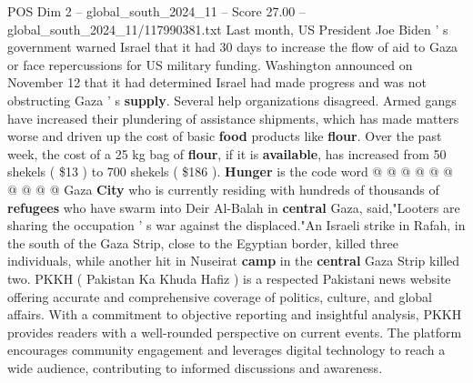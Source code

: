 \begin{textsample}{POS Dim 2 – global\_south\_2024\_11 – Score 27.00 – global\_south\_2024\_11/117990381.txt}
Last month, US President Joe Biden ' s government warned Israel that it had 30 days to increase the flow of aid to Gaza or face repercussions for US military funding.
Washington announced on November 12 that it had determined Israel had made progress and was not obstructing Gaza ' s \textbf{supply}.
Several help organizations disagreed.
Armed gangs have increased their plundering of assistance shipments, which has made matters worse and driven up the cost of basic \textbf{food} products like \textbf{flour}.
Over the past week, the cost of a 25 kg bag of \textbf{flour}, if it is \textbf{available}, has increased from 50 shekels ( \$13 ) to 700 shekels ( \$186 ). \textbf{Hunger} is the code word @ @ @ @ @ @ @ @ @ @ Gaza \textbf{City} who is currently residing with hundreds of thousands of \textbf{refugees} who have swarm into Deir Al-Balah in \textbf{central} Gaza, said,"Looters are sharing the occupation ' s war against the displaced."An Israeli strike in Rafah, in the south of the Gaza Strip, close to the Egyptian border, killed three individuals, while another hit in Nuseirat \textbf{camp} in the \textbf{central} Gaza Strip killed two.
PKKH ( Pakistan Ka Khuda Hafiz ) is a respected Pakistani news website offering accurate and comprehensive coverage of politics, culture, and global affairs.
With a commitment to objective reporting and insightful analysis, PKKH provides readers with a well-rounded perspective on current events.
The platform encourages community engagement and leverages digital technology to reach a wide audience, contributing to informed discussions and awareness.

\end{textsample}
